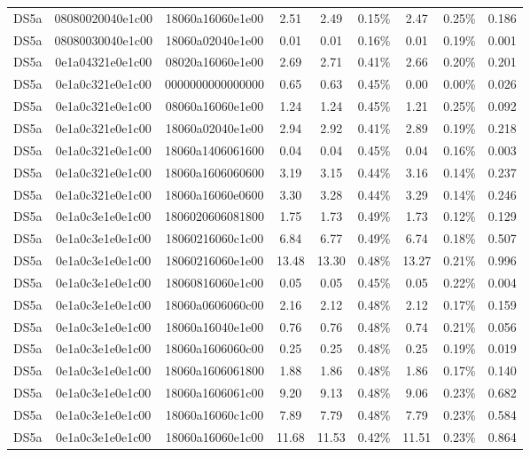 \begin{tabular}{|c|c c|c|c c|c c|c|}
  DS5a & 08080020040e1c00 & 18060a16060e1e00 & 2.51 & 2.49 & 0.15\% & 2.47 & 0.25\% & 0.186 \\
  DS5a & 08080030040e1c00 & 18060a02040e1e00 & 0.01 & 0.01 & 0.16\% & 0.01 & 0.19\% & 0.001 \\
  DS5a & 0e1a04321e0e1c00 & 08020a16060e1e00 & 2.69 & 2.71 & 0.41\% & 2.66 & 0.20\% & 0.201 \\
  DS5a & 0e1a0c321e0e1c00 & 0000000000000000 & 0.65 & 0.63 & 0.45\% & 0.00 & 0.00\% & 0.026 \\
  DS5a & 0e1a0c321e0e1c00 & 08060a16060e1e00 & 1.24 & 1.24 & 0.45\% & 1.21 & 0.25\% & 0.092 \\
  DS5a & 0e1a0c321e0e1c00 & 18060a02040e1e00 & 2.94 & 2.92 & 0.41\% & 2.89 & 0.19\% & 0.218 \\
  DS5a & 0e1a0c321e0e1c00 & 18060a1406061600 & 0.04 & 0.04 & 0.45\% & 0.04 & 0.16\% & 0.003 \\
  DS5a & 0e1a0c321e0e1c00 & 18060a1606060600 & 3.19 & 3.15 & 0.44\% & 3.16 & 0.14\% & 0.237 \\
  DS5a & 0e1a0c321e0e1c00 & 18060a16060e0600 & 3.30 & 3.28 & 0.44\% & 3.29 & 0.14\% & 0.246 \\
  DS5a & 0e1a0c3e1e0e1c00 & 1806020606081800 & 1.75 & 1.73 & 0.49\% & 1.73 & 0.12\% & 0.129 \\
  DS5a & 0e1a0c3e1e0e1c00 & 18060216060c1c00 & 6.84 & 6.77 & 0.49\% & 6.74 & 0.18\% & 0.507 \\
  DS5a & 0e1a0c3e1e0e1c00 & 18060216060e1e00 & 13.48 & 13.30 & 0.48\% & 13.27 & 0.21\% & 0.996 \\
  DS5a & 0e1a0c3e1e0e1c00 & 18060816060e1c00 & 0.05 & 0.05 & 0.45\% & 0.05 & 0.22\% & 0.004 \\
  DS5a & 0e1a0c3e1e0e1c00 & 18060a0606060c00 & 2.16 & 2.12 & 0.48\% & 2.12 & 0.17\% & 0.159 \\
  DS5a & 0e1a0c3e1e0e1c00 & 18060a16040e1e00 & 0.76 & 0.76 & 0.48\% & 0.74 & 0.21\% & 0.056 \\
  DS5a & 0e1a0c3e1e0e1c00 & 18060a1606060c00 & 0.25 & 0.25 & 0.48\% & 0.25 & 0.19\% & 0.019 \\
  DS5a & 0e1a0c3e1e0e1c00 & 18060a1606061800 & 1.88 & 1.86 & 0.48\% & 1.86 & 0.17\% & 0.140 \\
  DS5a & 0e1a0c3e1e0e1c00 & 18060a1606061c00 & 9.20 & 9.13 & 0.48\% & 9.06 & 0.23\% & 0.682 \\
  DS5a & 0e1a0c3e1e0e1c00 & 18060a16060c1c00 & 7.89 & 7.79 & 0.48\% & 7.79 & 0.23\% & 0.584 \\
  DS5a & 0e1a0c3e1e0e1c00 & 18060a16060e1c00 & 11.68 & 11.53 & 0.42\% & 11.51 & 0.23\% & 0.864 \\

\end{tabular}
